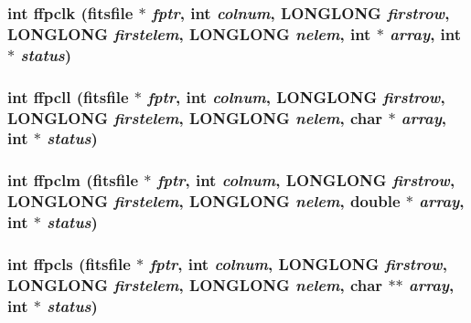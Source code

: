 \subsubsection{\setlength{\rightskip}{0pt plus 5cm}int ffpclk (\bf{fitsfile} $\ast$ {\em fptr}, int {\em colnum}, \bf{LONGLONG} {\em firstrow}, \bf{LONGLONG} {\em firstelem}, \bf{LONGLONG} {\em nelem}, int $\ast$ {\em array}, int $\ast$ {\em status})}\label{test_2roimasker_2fitsio_8h_d4e01a4e0406be50e5e104f31f5c8fea}


\subsubsection{\setlength{\rightskip}{0pt plus 5cm}int ffpcll (\bf{fitsfile} $\ast$ {\em fptr}, int {\em colnum}, \bf{LONGLONG} {\em firstrow}, \bf{LONGLONG} {\em firstelem}, \bf{LONGLONG} {\em nelem}, char $\ast$ {\em array}, int $\ast$ {\em status})}\label{test_2roimasker_2fitsio_8h_353d8ec816b71620a84af201290d5932}


\subsubsection{\setlength{\rightskip}{0pt plus 5cm}int ffpclm (\bf{fitsfile} $\ast$ {\em fptr}, int {\em colnum}, \bf{LONGLONG} {\em firstrow}, \bf{LONGLONG} {\em firstelem}, \bf{LONGLONG} {\em nelem}, double $\ast$ {\em array}, int $\ast$ {\em status})}\label{test_2roimasker_2fitsio_8h_af1f2dc6beaea63dbf91a8be037be940}


\subsubsection{\setlength{\rightskip}{0pt plus 5cm}int ffpcls (\bf{fitsfile} $\ast$ {\em fptr}, int {\em colnum}, \bf{LONGLONG} {\em firstrow}, \bf{LONGLONG} {\em firstelem}, \bf{LONGLONG} {\em nelem}, char $\ast$$\ast$ {\em array}, int $\ast$ {\em status})}\label{test_2roimasker_2fitsio_8h_d58114695cd1281daa17eff622c1e38a}


